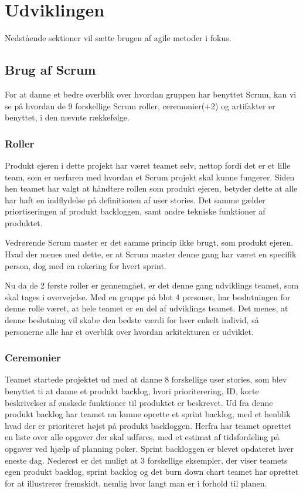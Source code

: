\chapter{Udviklingen}\label{ch:Udviklingen}

Nedstående sektioner vil sætte brugen af agile metoder i fokus. 

\section{Brug af Scrum}

For at danne et bedre overblik over hvordan gruppen har benyttet Scrum, kan vi se på hvordan de 9 forskellige Scrum roller, ceremonier(+2) og artifakter er benyttet, i den nævnte rækkefølge.

\subsection{Roller}

Produkt ejeren i dette projekt har været teamet selv, nettop fordi det er et lille team, som er uerfaren med hvordan et Scrum projekt skal kunne fungerer. Siden hen teamet har valgt at håndtere rollen som produkt ejeren, betyder dette at alle har haft en indflydelse på definitionen af user stories. Det samme gælder priortiseringen af produkt backloggen, samt andre tekniske funktioner af produktet. 

Vedrørende Scrum master er det samme princip ikke brugt, som produkt ejeren. Hvad der menes med dette, er at Scrum master denne gang har været en specifik person, dog med en rokering for hvert sprint. 

Nu da de 2 første roller er gennemgået, er det denne gang udviklings teamet, som skal tages i overvejelse. Med en gruppe på blot 4 personer, har beslutningen for denne rolle været, at hele teamet er en del af udviklings teamet. Det menes, at denne beslutning vil skabe den bedste værdi for hver enkelt individ, så personerne alle har et overblik over hvordan arkitekturen er udviklet. 



\subsection{Ceremonier}

Teamet startede projektet ud med at danne 8 forskellige user stories, som blev benyttet ti at danne et produkt backlog, hvori prioriterering, ID, korte beskrivelser af ønskede funktioner til produktet er beskrevet. Ud fra denne produkt backlog har teamet nu kunne oprette et sprint backlog, med et henblik hvad der er prioriteret højst på produkt backloggen. Herfra har teamet oprettet en liste over alle opgaver der skal udføres, med et estimat af tidsfordeling på opgaver ved hjælp af planning poker. Sprint backloggen er blevet opdateret hver eneste dag. Nederest er det muligt at 3 forskellige eksempler, der viser teamets egen produkt backlog, sprint backlog og det burn down chart teamet har oprettet for at illustrerer fremskidt, nemlig hvor langt man er i forhold til planen. 

